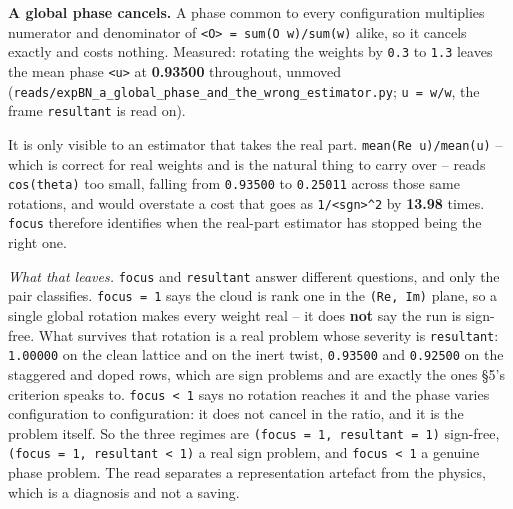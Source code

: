 \documentclass[10pt,letterpaper,twocolumn]{article}
\begin{document}
\textbf{A global phase cancels.} A phase common to every configuration multiplies numerator and
denominator of \texttt{\textless{}\allowbreak{}O\textgreater{}\allowbreak{}\ =\allowbreak{}\ sum(\allowbreak{}O\ w)\allowbreak{}/\allowbreak{}sum(\allowbreak{}w)\allowbreak{}} alike, so it cancels exactly and costs nothing. Measured:
rotating the weights by \texttt{0.\allowbreak{}3} to \texttt{1.\allowbreak{}3} leaves the mean phase \texttt{\textbar{}\allowbreak{}\textless{}\allowbreak{}u\textgreater{}\allowbreak{}\textbar{}\allowbreak{}} at \textbf{0.93500} throughout,
unmoved (\texttt{reads/\allowbreak{}expBN\_\allowbreak{}a\_\allowbreak{}global\_\allowbreak{}phase\_\allowbreak{}and\_\allowbreak{}the\_\allowbreak{}wrong\_\allowbreak{}estimator.\allowbreak{}py}; \texttt{u\ =\allowbreak{}\ w/\allowbreak{}\textbar{}\allowbreak{}w\textbar{}\allowbreak{}}, the frame \texttt{resultant}
is read on).

It is only visible to an estimator that takes the real part. \texttt{mean(\allowbreak{}Re\ u)\allowbreak{}/\allowbreak{}mean(\allowbreak{}\textbar{}\allowbreak{}u\textbar{}\allowbreak{})\allowbreak{}} -- which is
correct for real weights and is the natural thing to carry over -- reads \texttt{cos(\allowbreak{}theta)\allowbreak{}} too small,
falling from \texttt{0.\allowbreak{}93500} to \texttt{0.\allowbreak{}25011} across those same rotations, and would overstate a cost that
goes as \texttt{1/\allowbreak{}\textless{}\allowbreak{}sgn\textgreater{}\allowbreak{}\^{}2} by \textbf{13.98} times. \texttt{focus} therefore identifies when the real-part estimator
has stopped being the right one.

\emph{What that leaves.} \texttt{focus} and \texttt{resultant} answer
different questions, and only the pair classifies. \texttt{focus\ =\allowbreak{}\ 1} says the cloud is rank one in the
\texttt{(\allowbreak{}Re,\allowbreak{}\ Im)\allowbreak{}} plane, so a single global rotation makes every weight real -- it does \textbf{not} say the
run is sign-free. What survives that rotation is a real problem whose severity is \texttt{resultant}:
\texttt{1.\allowbreak{}00000} on the clean lattice and on the inert twist, \texttt{0.\allowbreak{}93500} and \texttt{0.\allowbreak{}92500} on the staggered and
doped rows, which are sign problems and are exactly the ones §5's criterion speaks to. \texttt{focus\ \textless{}\allowbreak{}\ 1}
says no rotation reaches it and the phase varies configuration to configuration: it does not cancel
in the ratio, and it is the problem itself. So the three regimes are \texttt{(\allowbreak{}focus\ =\allowbreak{}\ 1,\allowbreak{}\ resultant\ =\allowbreak{}\ 1)\allowbreak{}}
sign-free, \texttt{(\allowbreak{}focus\ =\allowbreak{}\ 1,\allowbreak{}\ resultant\ \textless{}\allowbreak{}\ 1)\allowbreak{}} a real sign problem, and \texttt{focus\ \textless{}\allowbreak{}\ 1} a genuine phase
problem. The read separates a representation artefact from the physics, which is a diagnosis and
not a saving.
\end{document}

